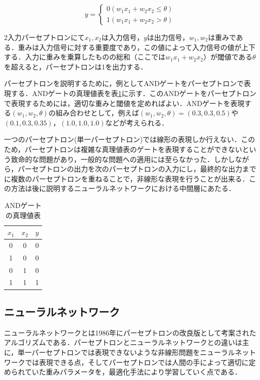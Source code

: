 \documentclass[a4j, 11pt]{jreport}
\begin{document}
\begin{equation}
y= \left \{
\begin{array}{l}
0　(w_1x_1 + w_2x_2 \leq \theta)\\
1　(w_1x_1 + w_2x_2 > \theta)
\end{array}
\right.
\label{eq:pa-septoron}
\end{equation}

2入力パーセプトロンにて$x_1, x_2$は入力信号，$y$は出力信号，$w_1, w_2$は重みである．重みは入力信号に対する重要度であり，この値によって入力信号の値が上下する．入力に重みを乗算したものの総和（ここでは$w_1x_1 + w_2x_2$）が閾値である$\theta$を超えると，パーセプトロンは1を出力する．

パーセプトロンを説明するために，例としてANDゲートをパーセプトロンで表現する．ANDゲートの真理値表を表\ref{tb:and_gate}に示す．このANDゲートをパーセプトロンで表現するためには，適切な重みと閾値を定めればよい．ANDゲートを表現する$(w_1, w_2, \theta)$の組み合わせとして，例えば$(w_1, w_2, \theta) = (0.3, 0.3, 0.5)$や$(0.1, 0.3, 0.35)$，$(1.0, 1.0, 1.0)$などが考えられる．

一つのパーセプトロン(単一パーセプトロン)では線形の表現しか行えない．このため，パーセプトロンは複雑な真理値表のゲートを表現することができないという致命的な問題があり，一般的な問題への適用には至らなかった．しかしながら，パーセプトロンの出力を次のパーセプトロンの入力にし，最終的な出力までに複数のパーセプトロンを重ねることで，非線形な表現を行うことが出来る．この方法は後に説明するニューラルネットワークにおける中間層にあたる．

\begin{table}[H]
  \centering
	\caption{ANDゲートの真理値表}
  \begin{tabular}{cc|c}
    $x_1$ & $x_2$ & $y$ \\ \hline
    0 & 0 & 0 \\ 
    1 & 0 & 0 \\
    0 & 1 & 0 \\
    1 & 1 & 1 \\
  \end{tabular}
  \label{tb:and_gate}
\end{table}


\subsection{ニューラルネットワーク}
ニューラルネットワークとは1986年にパーセプトロンの改良版として考案されたアルゴリズムである．パーセプトロンとニューラルネットワークとの違いは主に，単一パーセプトロンでは表現できないような非線形問題をニューラルネットワークでは表現できる点，そしてパーセプトロンでは人間の手によって適切に定められていた重みパラメータを，最適化手法により学習していく点である．
\end{document}
